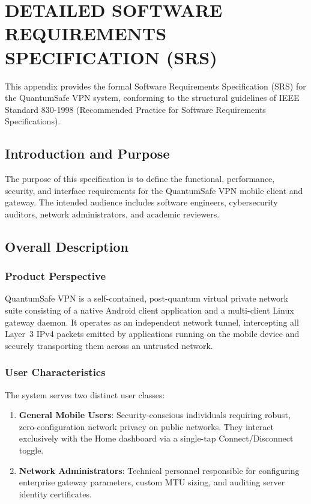 
\chapter{DETAILED SOFTWARE REQUIREMENTS SPECIFICATION (SRS)}
\label{app:srs}

This appendix provides the formal Software Requirements Specification (SRS) for the QuantumSafe VPN system, conforming to the structural guidelines of IEEE Standard 830-1998 (Recommended Practice for Software Requirements Specifications).

\section{Introduction and Purpose}
The purpose of this specification is to define the functional, performance, security, and interface requirements for the QuantumSafe VPN mobile client and gateway. The intended audience includes software engineers, cybersecurity auditors, network administrators, and academic reviewers.

\section{Overall Description}

\subsection{Product Perspective}
QuantumSafe VPN is a self-contained, post-quantum virtual private network suite consisting of a native Android client application and a multi-client Linux gateway daemon. It operates as an independent network tunnel, intercepting all Layer~3 IPv4 packets emitted by applications running on the mobile device and securely transporting them across an untrusted network.

\subsection{User Characteristics}
The system serves two distinct user classes:
\begin{enumerate}
    \item \textbf{General Mobile Users}: Security-conscious individuals requiring robust, zero-configuration network privacy on public networks. They interact exclusively with the Home dashboard via a single-tap Connect/Disconnect toggle.
    \item \textbf{Network Administrators}: Technical personnel responsible for configuring enterprise gateway parameters, custom MTU sizing, and auditing server identity certificates.
\end{enumerate}

